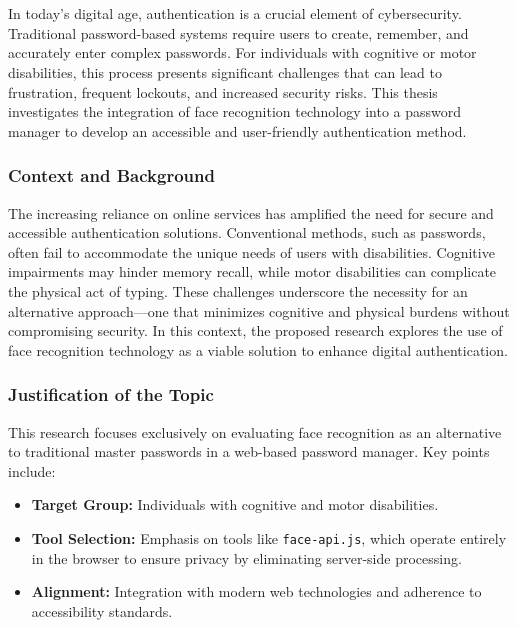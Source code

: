 
\chapter{}%
\label{ch:inleiding}

In today's digital age, authentication is a crucial element of cybersecurity. Traditional password-based systems require users to create, remember, and accurately enter complex passwords. For individuals with cognitive or motor disabilities, this process presents significant challenges that can lead to frustration, frequent lockouts, and increased security risks. This thesis investigates the integration of face recognition technology into a password manager to develop an accessible and user-friendly authentication method.

\subsection{Context and Background}
The increasing reliance on online services has amplified the need for secure and accessible authentication solutions. Conventional methods, such as passwords, often fail to accommodate the unique needs of users with disabilities. Cognitive impairments may hinder memory recall, while motor disabilities can complicate the physical act of typing. These challenges underscore the necessity for an alternative approach—one that minimizes cognitive and physical burdens without compromising security. In this context, the proposed research explores the use of face recognition technology as a viable solution to enhance digital authentication.

\subsection{Justification of the Topic}
This research focuses exclusively on evaluating face recognition as an alternative to traditional master passwords in a web-based password manager. Key points include:
\begin{itemize}
  \item \textbf{Target Group:} Individuals with cognitive and motor disabilities.
  \item \textbf{Tool Selection:} Emphasis on tools like \texttt{face-api.js}, which operate entirely in the browser to ensure privacy by eliminating server-side processing.
  \item \textbf{Alignment:} Integration with modern web technologies and adherence to accessibility standards.
\end{itemize}

